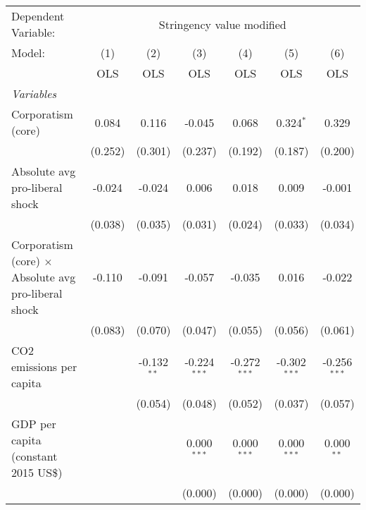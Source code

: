 
\begingroup
\centering
\begin{tabular}{lcccccc}
   \toprule
   Dependent Variable: & \multicolumn{6}{c}{Stringency value modified}\\
   Model:                                                      & (1)     & (2)           & (3)            & (4)            & (5)            & (6)\\  
                                                               &  OLS    & OLS           & OLS            & OLS            & OLS            & OLS\\  
   \midrule
   \emph{Variables}\\
   Corporatism (core)                                          & 0.084   & 0.116         & -0.045         & 0.068          & 0.324$^{*}$    & 0.329\\   
                                                               & (0.252) & (0.301)       & (0.237)        & (0.192)        & (0.187)        & (0.200)\\   
   Absolute avg pro-liberal shock                              & -0.024  & -0.024        & 0.006          & 0.018          & 0.009          & -0.001\\   
                                                               & (0.038) & (0.035)       & (0.031)        & (0.024)        & (0.033)        & (0.034)\\   
   Corporatism (core) $\times$ Absolute avg pro-liberal shock  & -0.110  & -0.091        & -0.057         & -0.035         & 0.016          & -0.022\\   
                                                               & (0.083) & (0.070)       & (0.047)        & (0.055)        & (0.056)        & (0.061)\\   
   CO2 emissions per capita                                    &         & -0.132$^{**}$ & -0.224$^{***}$ & -0.272$^{***}$ & -0.302$^{***}$ & -0.256$^{***}$\\   
                                                               &         & (0.054)       & (0.048)        & (0.052)        & (0.037)        & (0.057)\\   
   GDP per capita (constant 2015 US\$)                         &         &               & 0.000$^{***}$  & 0.000$^{***}$  & 0.000$^{***}$  & 0.000$^{**}$\\   
                                                               &         &               & (0.000)        & (0.000)        & (0.000)        & (0.000)\\   

\end{tabular}
